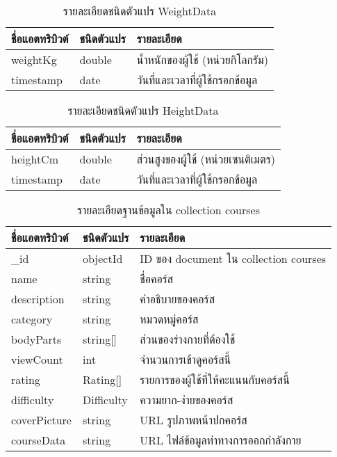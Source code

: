 \begin{table}
    \caption{รายละเอียดชนิดตัวแปร WeightData}
    \begin{tabularx}{\textwidth}{ | l | l | X | }
        \hline
        \bf ชื่อแอตทริบิวต์ & \bf ชนิดตัวแปร & \bf รายละเอียด \\\hline
        weightKg & double & น้ำหนักของผู้ใช้ (หน่วยกิโลกรัม)\\\hline
        timestamp & date & วันที่และเวลาที่ผู้ใช้กรอกข้อมูล\\\hline
    \end{tabularx}
\end{table}

\begin{table}
    \caption{รายละเอียดชนิดตัวแปร HeightData}
    \begin{tabularx}{\textwidth}{ | l | l | X | }
        \hline
        \bf ชื่อแอตทริบิวต์ & \bf ชนิดตัวแปร & \bf รายละเอียด \\\hline
        heightCm & double & ส่วนสูงของผู้ใช้ (หน่วยเซนติเมตร)\\\hline
        timestamp & date & วันที่และเวลาที่ผู้ใช้กรอกข้อมูล\\\hline
    \end{tabularx}
\end{table}

\begin{table}
    \caption{รายละเอียดฐานข้อมูลใน collection courses}
    \begin{tabularx}{\textwidth}{ | l | l | X | }
        \hline
        \bf ชื่อแอตทริบิวต์ & \bf ชนิดตัวแปร & \bf รายละเอียด \\\hline
        \_id & objectId & ID ของ document ใน collection courses\\\hline
        name & string & ชื่อคอร์ส\\\hline
        description & string & คำอธิบายของคอร์ส\\\hline
        category & string & หมวดหมู่คอร์ส\\\hline
        bodyParts & string[] & ส่วนของร่างกายที่ต้องใช้\\\hline
        viewCount & int & จำนวนการเข้าดูคอร์สนี้\\\hline
        rating & Rating[] & รายการของผู้ใช้ที่ให้คะแนนกับคอร์สนี้\\\hline
        difficulty & Difficulty & ความยาก-ง่ายของคอร์ส\\\hline
        coverPicture & string & URL รูปภาพหน้าปกคอร์ส\\\hline
        courseData & string & URL ไฟล์ข้อมูลท่าทางการออกกำลังกาย\\\hline
    \end{tabularx}
\end{table}

